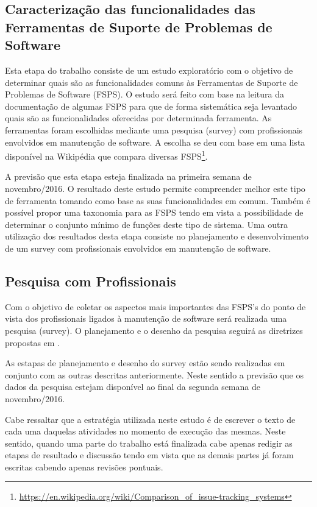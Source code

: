\documentclass[10pt,a4paper]{report}
\begin{document}
\subsection{Caracterização das funcionalidades das Ferramentas de Suporte de Problemas de Software }
\label{subsec:caracterizacao}

Esta etapa do trabalho consiste de um estudo exploratório com o objetivo de
determinar quais são as funcionalidades comuns às Ferramentas de Suporte de
Problemas de Software (FSPS). O estudo será feito com base na leitura da
documentação de algumas FSPS para que de forma sistemática seja levantado quais
são as funcionalidades oferecidas por determinada ferramenta. As ferramentas
foram escolhidas mediante uma pesquisa (survey) com profissionais envolvidos em
manutenção de software. A escolha se deu com base em uma lista disponível na
Wikipédia que compara diversas
FSPS\footnote{\url{https://en.wikipedia.org/wiki/Comparison_of_issue-tracking_systems}}.

A previsão que esta etapa esteja finalizada na primeira semana de novembro/2016.
O resultado deste estudo permite compreender melhor este tipo de ferramenta
tomando como base as suas funcionalidades em comum. Também é possível propor
uma taxonomia para as FSPS tendo em vista a possibilidade de determinar o
conjunto mínimo de funções deste tipo de sistema. Uma outra utilização dos
resultados desta etapa consiste no planejamento e desenvolvimento de um survey
com profissionais envolvidos em manutenção de software.

\subsection{Pesquisa com Profissionais}
\label{subsec:survey}
Com o objetivo de coletar os aspectos mais importantes das FSPS's do ponto de
vista dos profissionais ligados à manutenção de software será realizada uma
pesquisa (survey). O planejamento e o desenho da pesquisa seguirá as diretrizes
propostas em \cite{wohlin2012experimentation}.

As estapas de planejamento e desenho do survey  estão sendo realizadas em
conjunto com as outras descritas anteriormente. Neste sentido a previsão que os
dados da pesquisa estejam disponível ao final da segunda semana de
novembro/2016.

Cabe ressaltar que a estratégia utilizada neste estudo é de escrever o texto de
cada uma daquelas atividades no momento de execução das mesmas. Neste sentido,
quando uma parte do trabalho está finalizada cabe apenas redigir as etapas de
resultado e discussão tendo em vista que as demais partes já foram escritas
cabendo apenas revisões pontuais.
\end{document}
